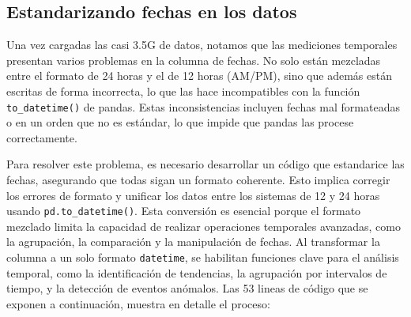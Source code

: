 \documentclass[11pt]{article}
\begin{document}
    \hypertarget{estandarizando-fechas-en-los-datos}{%
\subsection{Estandarizando fechas en los
datos}\label{estandarizando-fechas-en-los-datos}}

    Una vez cargadas las casi 3.5G de datos, notamos que las mediciones
temporales presentan varios problemas en la columna de fechas. No solo
están mezcladas entre el formato de 24 horas y el de 12 horas (AM/PM),
sino que además están escritas de forma incorrecta, lo que las hace
incompatibles con la función \texttt{to\_datetime()} de pandas. Estas
inconsistencias incluyen fechas mal formateadas o en un orden que no es
estándar, lo que impide que pandas las procese correctamente.

Para resolver este problema, es necesario desarrollar un código que
estandarice las fechas, asegurando que todas sigan un formato coherente.
Esto implica corregir los errores de formato y unificar los datos entre
los sistemas de 12 y 24 horas usando \texttt{pd.to\_datetime()}. Esta
conversión es esencial porque el formato mezclado limita la capacidad de
realizar operaciones temporales avanzadas, como la agrupación, la
comparación y la manipulación de fechas. Al transformar la columna a un
solo formato \texttt{datetime}, se habilitan funciones clave para el
análisis temporal, como la identificación de tendencias, la agrupación
por intervalos de tiempo, y la detección de eventos anómalos. Las 53
lineas de código que se exponen a continuación, muestra en detalle el
proceso:
\end{document}
